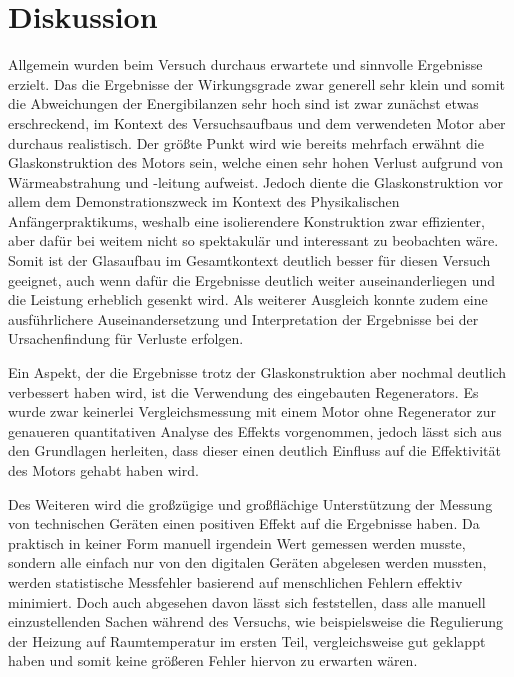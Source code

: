\documentclass{article}
\begin{document}
\newpage
\section{Diskussion}

Allgemein wurden beim Versuch durchaus erwartete und sinnvolle Ergebnisse erzielt. Das die Ergebnisse der Wirkungsgrade zwar generell sehr klein und somit die Abweichungen der Energibilanzen sehr hoch sind ist zwar zunächst etwas erschreckend, im Kontext des Versuchsaufbaus und dem verwendeten Motor aber durchaus realistisch. Der größte Punkt wird wie bereits mehrfach erwähnt die Glaskonstruktion des Motors sein, welche einen sehr hohen Verlust aufgrund von Wärmeabstrahung und -leitung aufweist. Jedoch diente die Glaskonstruktion vor allem dem Demonstrationszweck im Kontext des Physikalischen Anfängerpraktikums, weshalb eine isolierendere Konstruktion zwar effizienter, aber dafür bei weitem nicht so spektakulär und interessant zu beobachten wäre. Somit ist der Glasaufbau im Gesamtkontext deutlich besser für diesen Versuch geeignet, auch wenn dafür die Ergebnisse deutlich weiter auseinanderliegen und die Leistung erheblich gesenkt wird. Als weiterer Ausgleich konnte zudem eine ausführlichere Auseinandersetzung und Interpretation der Ergebnisse bei der Ursachenfindung für Verluste erfolgen. 

Ein Aspekt, der die Ergebnisse trotz der Glaskonstruktion aber nochmal deutlich verbessert haben wird, ist die Verwendung des eingebauten Regenerators. Es wurde zwar keinerlei Vergleichsmessung mit einem Motor ohne Regenerator zur genaueren quantitativen Analyse des Effekts vorgenommen, jedoch lässt sich aus den Grundlagen herleiten, dass dieser einen deutlich Einfluss auf die Effektivität des Motors gehabt haben wird. 

Des Weiteren wird die großzügige und großflächige Unterstützung der Messung von technischen Geräten einen positiven Effekt auf die Ergebnisse haben. Da praktisch in keiner Form manuell irgendein Wert gemessen werden musste, sondern alle einfach nur von den digitalen Geräten abgelesen werden mussten, werden statistische Messfehler basierend auf menschlichen Fehlern effektiv minimiert. Doch auch abgesehen davon lässt sich feststellen, dass alle manuell einzustellenden Sachen während des Versuchs, wie beispielsweise die Regulierung der Heizung auf Raumtemperatur im ersten Teil, vergleichsweise gut geklappt haben und somit keine größeren Fehler hiervon zu erwarten wären. 
\end{document}
